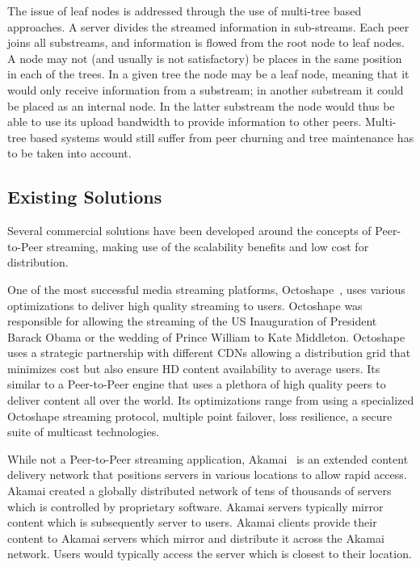 The issue of leaf nodes is addressed through the use of multi-tree based
approaches. A server divides the streamed information in sub-streams. Each
peer joins all substreams, and information is flowed from the root node to
leaf nodes. A node may not (and usually is not satisfactory) be places in the
same position in each of the trees. In a given tree the node may be a leaf
node, meaning that it would only receive information from a substream; in
another substream it could be placed as an internal node. In the latter
substream the node would thus be able to use its upload bandwidth to provide
information to other peers. Multi-tree based systems would still suffer from
peer churning and tree maintenance has to be taken into account.

\subsection{Existing Solutions}
\label{subsec:p2p-systems:solutions}

Several commercial solutions have been developed around the concepts of
Peer-to-Peer streaming, making use of the scalability benefits and low cost
for distribution.

One of the most successful media streaming platforms,
Octoshape~\cite{octoshape},
uses various optimizations to deliver high quality streaming to users.
Octoshape was responsible for allowing the streaming of the US Inauguration of
President Barack Obama or the wedding of Prince William to Kate Middleton.
Octoshape uses a strategic partnership with different CDNs allowing a
distribution grid that minimizes cost but also ensure HD content availability
to average users. Its similar to a Peer-to-Peer engine that uses a plethora of
high quality peers to deliver content all over the world. Its optimizations
range from using a specialized Octoshape streaming protocol, multiple point
failover, loss resilience, a secure suite of multicast technologies.

While not a Peer-to-Peer streaming application, Akamai~\cite{akamai} is an
extended content delivery network that positions servers in various locations
to allow rapid access. Akamai created a globally distributed network of
tens of thousands of servers which is controlled by proprietary software.
Akamai servers typically mirror content which is subsequently server to users.
Akamai clients provide their content to Akamai servers which mirror and
distribute it across the Akamai network. Users would typically access the
server which is closest to their location.

